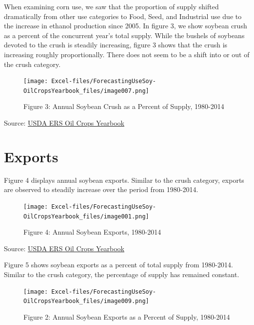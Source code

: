 \documentclass[
  letterpaper,
  DIV=11,
  numbers=noendperiod]{scrreprt}
\begin{document}
When examining corn use, we saw that the proportion of supply shifted
dramatically from other use categories to Food, Seed, and Industrial use
due to the increase in ethanol production since 2005. In figure 3, we
show soybean crush as a percent of the concurrent year's total supply.
While the bushels of soybeans devoted to the crush is steadily
increasing, figure 3 shows that the crush is increasing roughly
proportionally. There does not seem to be a shift into or out of the
crush category.

\begin{figure}

{\centering \texttt{[image: Excel-files/ForecastingUseSoy-OilCropsYearbook\_files/image007.png]}

}

\caption{Figure 3: Annual Soybean Crush as a Percent of Supply,
1980-2014}

\end{figure}

Source:
\href{http://www.ers.usda.gov/data-products/oil-crops-yearbook.aspx}{USDA
ERS Oil Crops Yearbook}

\hypertarget{exports-2}{%
\section{Exports}\label{exports-2}}

Figure 4 displays annual soybean exports. Similar to the crush category,
exports are observed to steadily increase over the period from
1980-2014.

\begin{figure}

{\centering \texttt{[image: Excel-files/ForecastingUseSoy-OilCropsYearbook\_files/image001.png]}

}

\caption{Figure 4: Annual Soybean Exports, 1980-2014}

\end{figure}

Source:
\href{http://www.ers.usda.gov/data-products/oil-crops-yearbook.aspx}{USDA
ERS Oil Crops Yearbook}

Figure 5 shows soybean exports as a percent of total supply from
1980-2014. Similar to the crush category, the percentage of supply has
remained constant.

\begin{figure}

{\centering \texttt{[image: Excel-files/ForecastingUseSoy-OilCropsYearbook\_files/image009.png]}

}

\caption{Figure 2: Annual Soybean Exports as a Percent of Supply,
1980-2014}

\end{figure}
\end{document}
